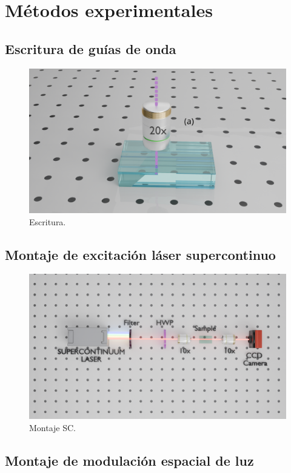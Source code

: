 \chapter{Métodos experimentales}

\section{Escritura de guías de onda \label{cap:fs}}
\begin{figure}[H]
	\centering
	\includegraphics[width=0.6\linewidth, trim={18cm 4cm 15cm 6cm},clip]{media/fabrication}
	\caption{Escritura.}
\end{figure}

\section{Montaje de excitación láser supercontinuo}
\begin{figure}[H]
	\centering
	\includegraphics[width=\linewidth, trim={5cm 9cm 3cm 7cm},clip]{media/SC_setup}
	\caption{Montaje SC.}
\end{figure}
\newpage
\section{Montaje de modulación espacial de luz}

